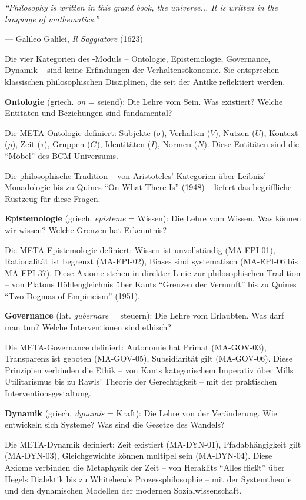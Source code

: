 \epigraph{\textit{``Philosophy is written in this grand book, the universe... It is written in the language of mathematics.''}}{--- Galileo Galilei, \textit{Il Saggiatore} (1623)}

Die vier Kategorien des \META-Moduls -- Ontologie, Epistemologie, Governance, Dynamik -- sind keine Erfindungen der Verhaltensökonomie. Sie entsprechen klassischen philosophischen Disziplinen, die seit der Antike reflektiert werden.

\textbf{Ontologie} (griech. \textit{on} = seiend): Die Lehre vom Sein. Was existiert? Welche Entitäten und Beziehungen sind fundamental?

Die META-Ontologie definiert: Subjekte ($\sigma$), Verhalten ($V$), Nutzen ($U$), Kontext ($\rho$), Zeit ($\tau$), Gruppen ($G$), Identitäten ($I$), Normen ($N$). Diese Entitäten sind die ``Möbel'' des BCM-Universums.

Die philosophische Tradition -- von Aristoteles' Kategorien über Leibniz' Monadologie bis zu Quines ``On What There Is'' (1948) -- liefert das begriffliche Rüstzeug für diese Fragen.

\textbf{Epistemologie} (griech. \textit{episteme} = Wissen): Die Lehre vom Wissen. Was können wir wissen? Welche Grenzen hat Erkenntnis?

Die META-Epistemologie definiert: Wissen ist unvollständig (MA-EPI-01), Rationalität ist begrenzt (MA-EPI-02), Biases sind systematisch (MA-EPI-06 bis MA-EPI-37). Diese Axiome stehen in direkter Linie zur philosophischen Tradition -- von Platons Höhlengleichnis über Kants ``Grenzen der Vernunft'' bis zu Quines ``Two Dogmas of Empiricism'' (1951).

\textbf{Governance} (lat. \textit{gubernare} = steuern): Die Lehre vom Erlaubten. Was darf man tun? Welche Interventionen sind ethisch?

Die META-Governance definiert: Autonomie hat Primat (MA-GOV-03), Transparenz ist geboten (MA-GOV-05), Subsidiarität gilt (MA-GOV-06). Diese Prinzipien verbinden die Ethik -- von Kants kategorischem Imperativ über Mills Utilitarismus bis zu Rawls' Theorie der Gerechtigkeit -- mit der praktischen Interventionsgestaltung.

\textbf{Dynamik} (griech. \textit{dynamis} = Kraft): Die Lehre von der Veränderung. Wie entwickeln sich Systeme? Was sind die Gesetze des Wandels?

Die META-Dynamik definiert: Zeit existiert (MA-DYN-01), Pfadabhängigkeit gilt (MA-DYN-03), Gleichgewichte können multipel sein (MA-DYN-04). Diese Axiome verbinden die Metaphysik der Zeit -- von Heraklits ``Alles fließt'' über Hegels Dialektik bis zu Whiteheads Prozessphilosophie -- mit der Systemtheorie und den dynamischen Modellen der modernen Sozialwissenschaft.

